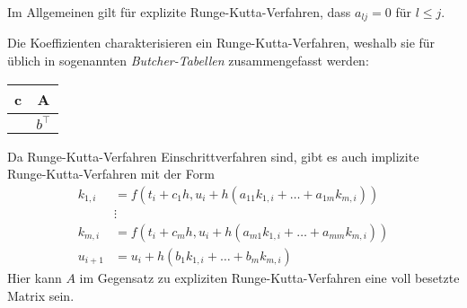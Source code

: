Im Allgemeinen gilt für explizite Runge-Kutta-Verfahren, dass $a_{lj} = 0$ für $l \leq j$.\\
\begin{bem}
    Die Koeffizienten charakterisieren ein Runge-Kutta-Verfahren, weshalb sie für üblich in sogenannten
    \textit{Butcher-Tabellen} zusammengefasst werden:
    \begin{center}
        \begin{tabular}{c | c}
            c & A \\
            \hline
            & $b^{\intercal}$
        \end{tabular}
    \end{center}
\end{bem}
Da Runge-Kutta-Verfahren Einschrittverfahren sind, gibt es auch implizite Runge-Kutta-Verfahren mit der Form
\begin{align*}
    k_{1,i} &= f(t_i+c_1h, u_i + h(a_{11}k_{1,i} + \dots + a_{1m} k_{m,i})) \\
    &\vdots\\
    k_{m,i} &= f(t_i+c_mh, u_i + h(a_{m1}k_{1,i} + \dots + a_{mm} k_{m,i}))\\
    u_{i+1} &= u_i + h(b_1 k_{1,i} + \dots + b_m k_{m,i})
\end{align*}
Hier kann $A$ im Gegensatz zu expliziten Runge-Kutta-Verfahren eine voll besetzte Matrix sein.

